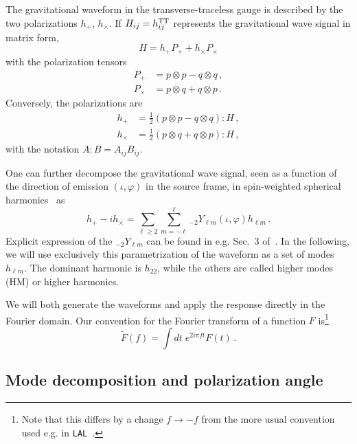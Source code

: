 \documentclass[aps,showpacs,twocolumn,prd,superscriptaddress,nofootinbib]{revtex4-1}
\newcommand{\be}{\begin{equation}}
\newcommand{\ee}{\end{equation}}
\newcommand{\bsub}{\begin{subequations}}
\newcommand{\esub}{\end{subequations}}
\begin{document}
The gravitational waveform in the transverse-traceless gauge is described by the two polarizations $h_{+}$, $h_{\times}$. If $H_{ij} = h_{ij}^{\rm TT}$ represents the gravitational wave signal in matrix form,
\be
	H = h_{+} P_{+} + h_{\times} P_{\times}
\ee
with the polarization tensors
\bsub
\begin{align}
	P_{+} &= p \otimes p - q \otimes q \,,\\
	P_{\times} &= p \otimes q + q \otimes p \,.
\end{align}
\esub
Conversely, the polarizations are
\bsub
\begin{align}
	h_{+} &= \frac{1}{2} \left(p \otimes p - q \otimes q \right) : H \,,\\
	h_{\times} &= \frac{1}{2} \left( p \otimes q + q \otimes p \right) : H \,,
\end{align}
\esub
with the notation $A : B = A_{ij}B_{ij}$.

One can further decompose the gravitational wave signal, seen as a function of the direction of emission $(\iota, \varphi)$ in the source frame, in spin-weighted spherical harmonics~\cite{Goldberg+67} as
\be\label{eq:hpcmodes}
	h_{+} - i h_{\times} = \sum_{\ell \geq 2} \sum_{m = -\ell}^{\ell} {}_{-2}Y_{\ell m} (\iota, \varphi) h_{\ell m} \,.
\ee
Explicit expression of the ${}_{-2}Y_{\ell m}$ can be found in e.g. Sec.~3 of~\cite{BlanchetLiving}. In the following, we will use exclusively this parametrization of the waveform as a set of modes $h_{\ell m}$. The dominant harmonic is $h_{22}$, while the others are called higher modes (HM) or higher harmonics.

We will both generate the waveforms and apply the response directly in the Fourier domain. Our convention for the Fourier transform of a function $F$ is\footnote{Note that this differs by a change $f\rightarrow -f$ from the more usual convention used e.g. in \texttt{LAL}~\cite{lal}.}
\be\label{eq:defFourier}
	\tilde{F}(f) = \int dt \; e^{2 i \pi f t} F(t) \,.
\ee


\subsection{Mode decomposition and polarization angle}
\label{sec:modespol}
\end{document}
